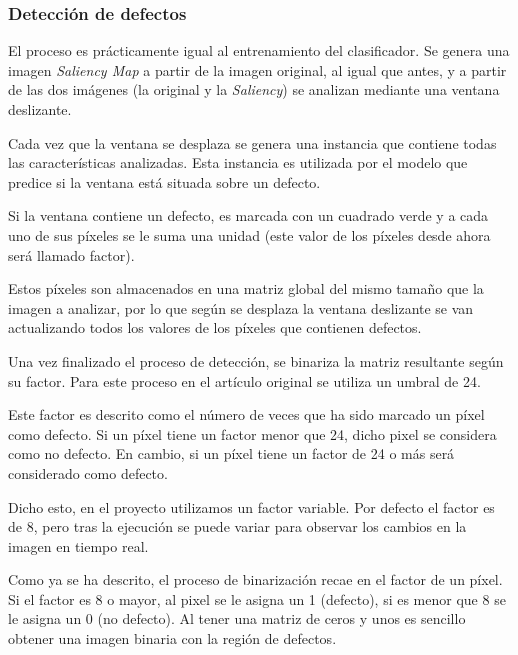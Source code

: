 \subsubsection{Detección de defectos}
El proceso es prácticamente igual al entrenamiento del clasificador. Se genera una imagen \emph{Saliency Map} a partir de la imagen original, al igual que antes, y a partir de las dos imágenes (la original y la \emph{Saliency}) se analizan mediante una ventana deslizante.

Cada vez que la ventana se desplaza se genera una instancia que contiene todas las características analizadas. Esta instancia es utilizada por el modelo que predice si la ventana está situada sobre un defecto.

Si la ventana contiene un defecto, es marcada con un cuadrado verde y a cada uno de sus píxeles se le suma una unidad (este valor de los píxeles desde ahora será llamado factor).

Estos píxeles son almacenados en una matriz global del mismo tamaño que la imagen a analizar, por lo que según se desplaza la ventana deslizante se van actualizando todos los valores de los píxeles que contienen defectos.

Una vez finalizado el proceso de detección, se binariza la matriz resultante según su factor. Para este proceso en el artículo original \cite{DomingoMery} se utiliza un umbral de 24.

Este factor es descrito como el número de veces que ha sido marcado un píxel como defecto. Si un píxel tiene un factor menor que 24, dicho pixel se considera como no defecto. En cambio, si un píxel tiene un factor de 24 o más será considerado como defecto.

Dicho esto, en el proyecto utilizamos un factor variable. Por defecto el factor es de 8, pero tras la ejecución se puede variar para observar los cambios en la imagen en tiempo real.

Como ya se ha descrito, el proceso de binarización recae en el factor de un píxel. Si el factor es 8 o mayor, al pixel se le asigna un 1 (defecto), si es menor que 8 se le asigna un 0 (no defecto). Al tener una matriz de ceros y unos es sencillo obtener una imagen binaria con la región de defectos.


